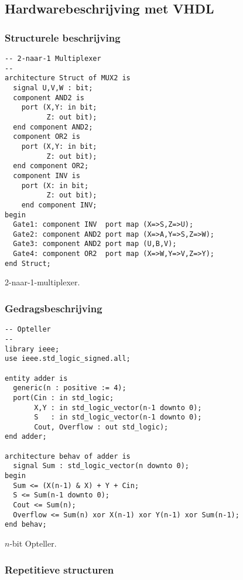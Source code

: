 \subsection{Hardwarebeschrijving met VHDL}
\subsubsection{Structurele beschrijving}
\begin{vhdlcode}[hbt]
\centering
\begin{lstlisting}
-- 2-naar-1 Multiplexer
--
architecture Struct of MUX2 is
  signal U,V,W : bit;
  component AND2 is
    port (X,Y: in bit;
          Z: out bit);
  end component AND2;
  component OR2 is
    port (X,Y: in bit;
          Z: out bit);
  end component OR2;
  component INV is
    port (X: in bit;
          Z: out bit);
    end component INV;
begin
  Gate1: component INV  port map (X=>S,Z=>U);
  Gate2: component AND2 port map (X=>A,Y=>S,Z=>W);
  Gate3: component AND2 port map (U,B,V);
  Gate4: component OR2  port map (X=>W,Y=>V,Z=>Y);
end Struct;
\end{lstlisting}
\caption{2-naar-1-multiplexer.}
\label{vhdl:bToAMultiplexer}
\end{vhdlcode}
\subsubsection{Gedragsbeschrijving}
\begin{vhdlcode}[hbt]
\centering
\begin{lstlisting}
-- Opteller
--
library ieee;
use ieee.std_logic_signed.all;

entity adder is
  generic(n : positive := 4);
  port(Cin : in std_logic;
       X,Y : in std_logic_vector(n-1 downto 0);
       S   : in std_logic_vector(n-1 downto 0);
       Cout, Overflow : out std_logic);
end adder;

architecture behav of adder is
  signal Sum : std_logic_vector(n downto 0);
begin
  Sum <= (X(n-1) & X) + Y + Cin;
  S <= Sum(n-1 downto 0);
  Cout <= Sum(n);
  Overflow <= Sum(n) xor X(n-1) xor Y(n-1) xor Sum(n-1);
end behav;
\end{lstlisting}
\caption{$n$-bit Opteller.}
\label{vhdl:adder}
\end{vhdlcode}
\subsubsection{Repetitieve structuren}
\label{ss:combinatorischVHDLHardware}